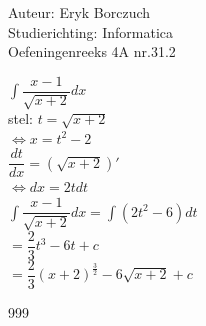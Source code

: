\documentclass[a4paper]{article}
\begin{document}
  
\noindent \large Auteur: Eryk Borczuch \\
\noindent \large Studierichting: Informatica\\
\noindent \large Oefeningenreeks 4A nr.31.2\\

\medskip

\normalsize
$\displaystyle \int \dfrac{x-1}{\sqrt{x+2}}dx$\\

stel: $t = \sqrt{x+2}$\\

$\Leftrightarrow x = t^2-2$\\

$\dfrac{dt}{dx} = (\sqrt{x+2})'$\\

$\Leftrightarrow dx = 2t dt$\\

$\displaystyle \int \dfrac{x-1}{\sqrt{x+2}}dx = \int(2t^2 -6 )dt$\\

$ = \dfrac{2}{3}t^3 -6t +c $\\

$= \dfrac{2}{3}(x+2)^{\tfrac{3}{2}}-6 \sqrt{x+2}+c$

\begin{thebibliography}{999}
\end{thebibliography}
\end{document}
